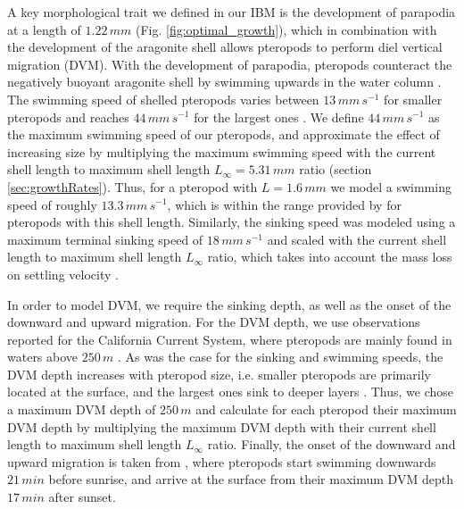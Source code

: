 A key morphological trait we defined in our IBM is the development of parapodia at a length of $1.22\,mm$ (Fig. \ref{fig:optimal_growth}), which in combination with the development of the aragonite shell allows pteropods to perform diel vertical migration (DVM). With the development of parapodia, pteropods counteract the negatively buoyant aragonite shell \citep{Byrne1984SettlingSpeed,Bergan2017SwimmingSinkingSpeeds} by swimming upwards in the water column \citep{Murphy2016UpwardSwimming}. The swimming speed of shelled pteropods varies between $13 \, mm \, s^{-1}$ for smaller pteropods and reaches $44\, mm\, s^{-1}$ for the largest ones \citep{Chang2012SwimmingSpeedSize}. We define $44\, mm\, s^{-1}$ as the maximum swimming speed of our pteropods, and approximate the effect of increasing size by multiplying the maximum swimming speed with the current shell length to maximum shell length $L_{\infty} = 5.31\, mm$ ratio (section \ref{sec:growthRates}). Thus, for a pteropod with $L = 1.6\,mm$ we model a swimming speed of roughly $13.3 \, mm \, s^{-1}$, which is within the range provided by \cite{Murphy2016UpwardSwimming} for pteropods with this shell length. Similarly, the sinking speed was modeled using a maximum terminal sinking speed of $18\, mm\, s^{-1}$ \citep{Bergan2017SwimmingSinkingSpeeds} and scaled with the current shell length to maximum shell length $L_{\infty}$ ratio, which takes into account the mass loss on settling velocity \citep{Byrne1984SettlingSpeed}.


In order to model DVM, we require the sinking depth, as well as the onset of the downward and upward migration. For the DVM depth, we use observations reported for the California Current System, where pteropods are mainly found in waters above $250\, m$ \citep{Bednarsek2015VerticalDistribution}. As was the case for the sinking and swimming speeds, the DVM depth increases with pteropod size, i.e. smaller pteropods are primarily located at the surface, and the largest ones sink to deeper layers  \citep{Bednarsek2015VerticalDistribution}. Thus, we chose a maximum DVM depth of $250\, m$ and calculate for each pteropod their maximum DVM depth by multiplying the maximum DVM depth with their current shell length to maximum shell length $L_{\infty}$ ratio. Finally, the onset of the downward and upward migration is taken from \cite{Bianchi2015GlobalDVM}, where pteropods start swimming downwards $21\, min$ before sunrise, and arrive at the surface from their maximum DVM depth $17\, min$ after sunset. 





